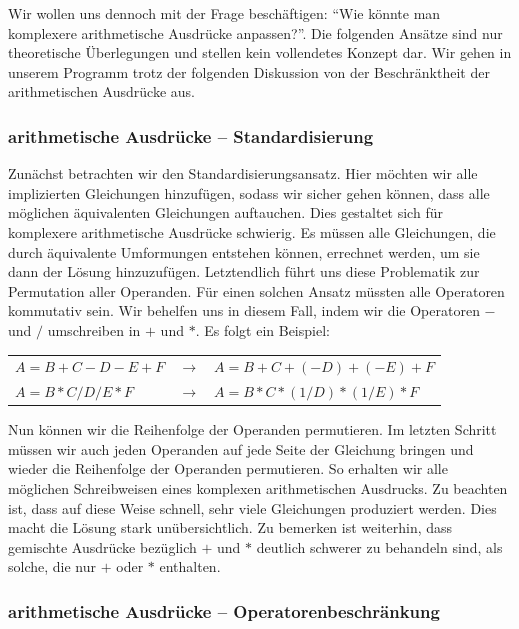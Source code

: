 Wir wollen uns dennoch mit der Frage beschäftigen: ``Wie könnte man komplexere arithmetische Ausdrücke anpassen?''. Die folgenden Ansätze sind nur theoretische Überlegungen und stellen kein vollendetes Konzept dar. Wir gehen in unserem Programm trotz der folgenden Diskussion von der Beschränktheit der arithmetischen Ausdrücke aus.

\subsubsection{arithmetische Ausdrücke -- Standardisierung}

Zunächst betrachten wir den Standardisierungsansatz. Hier möchten wir alle implizierten Gleichungen hinzufügen, sodass wir sicher gehen können, dass alle möglichen äquivalenten Gleichungen auftauchen. Dies gestaltet sich für komplexere arithmetische Ausdrücke schwierig. Es müssen alle Gleichungen, die durch äquivalente Umformungen entstehen können, errechnet werden, um sie dann der Lösung hinzuzufügen. Letztendlich führt uns diese Problematik zur Permutation aller Operanden. Für einen solchen Ansatz müssten alle Operatoren kommutativ sein. Wir behelfen uns in diesem Fall, indem wir die Operatoren $-$ und $/$ umschreiben in $+$ und $*$. Es folgt ein Beispiel:

\begin{tabular}{lll}
$A=B+C-D-E+F$ & $\to$ & $A=B+C+(-D)+(-E)+F$\\
$A=B*C/D/E*F$ & $\to$ & $A=B*C*(1/D)*(1/E)*F$\\
\end{tabular}

Nun können wir die Reihenfolge der Operanden permutieren. Im letzten Schritt müssen wir auch jeden Operanden auf jede Seite der Gleichung bringen und wieder die Reihenfolge der Operanden permutieren. So erhalten wir alle möglichen Schreibweisen eines komplexen arithmetischen Ausdrucks. Zu beachten ist, dass auf diese Weise schnell, sehr viele Gleichungen produziert werden. Dies macht die Lösung stark unübersichtlich. Zu bemerken ist weiterhin, dass gemischte Ausdrücke bezüglich $+$ und $*$ deutlich schwerer zu behandeln sind, als solche, die nur $+$ oder $*$ enthalten.

\subsubsection{arithmetische Ausdrücke -- Operatorenbeschränkung}

